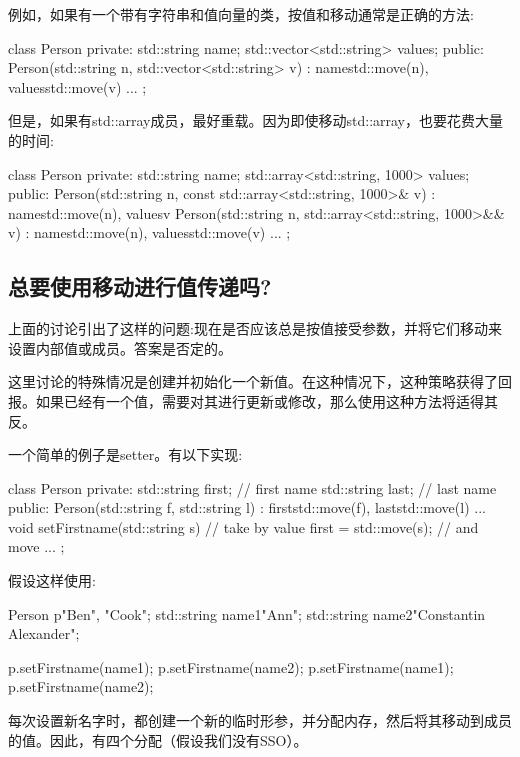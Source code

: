 例如，如果有一个带有字符串和值向量的类，按值和移动通常是正确的方法:

\begin{cppcode}
class Person {
private:
	std::string name;
	std::vector<std::string> values;
public:
	Person(std::string n, std::vector<std::string> v)
	: name{std::move(n)}, values{std::move(v)} {
	}
	...
};
\end{cppcode}

但是，如果有std::array成员，最好重载。因为即使移动std::array，也要花费大量的时间:

\begin{cppcode}
class Person {
private:
	std::string name;
	std::array<std::string, 1000> values;
public:
	Person(std::string n, const std::array<std::string, 1000>& v)
	: name{std::move(n)}, values{v} {
	}
	Person(std::string n, std::array<std::string, 1000>&& v)
	: name{std::move(n)}, values{std::move(v)} {
	}
	...
};
\end{cppcode}

\subsection{总要使用移动进行值传递吗?}

上面的讨论引出了这样的问题:现在是否应该总是按值接受参数，并将它们移动来设置内部值或成员。答案是否定的。

这里讨论的特殊情况是创建并初始化一个新值。在这种情况下，这种策略获得了回报。如果已经有一个值，需要对其进行更新或修改，那么使用这种方法将适得其反。

一个简单的例子是setter。有以下实现:

\begin{cppcode}
class Person {
private:
	std::string first; // first name
	std::string last; // last name
public:
	Person(std::string f, std::string l)
	: first{std::move(f)}, last{std::move(l)} {
	}
	...
	void setFirstname(std::string s) { // take by value
		first = std::move(s); // and move
	}
	...
};
\end{cppcode}

假设这样使用:

\begin{cppcode}
Person p{"Ben", "Cook"};
std::string name1{"Ann"};
std::string name2{"Constantin Alexander"};

p.setFirstname(name1);
p.setFirstname(name2);
p.setFirstname(name1);
p.setFirstname(name2);
\end{cppcode}

每次设置新名字时，都创建一个新的临时形参，并分配内存，然后将其移动到成员的值。因此，有四个分配（假设我们没有SSO）。

